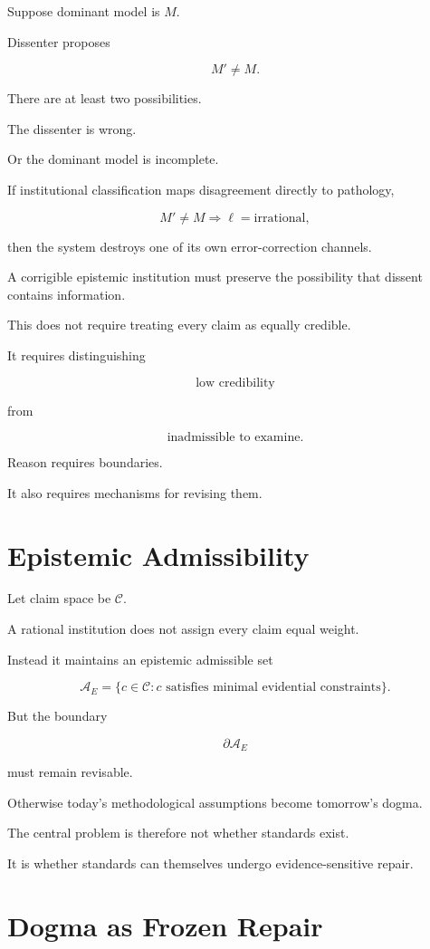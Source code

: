 \documentclass[11pt,oneside]{book}
\theoremstyle{definition}
\theoremstyle{remark}
\newcommand{\A}{\mathcal{A}}
\begin{document}
Suppose dominant model is \(M\).

Dissenter proposes

\[
M'\neq M.
\]

There are at least two possibilities.

The dissenter is wrong.

Or the dominant model is incomplete.

If institutional classification maps disagreement directly to pathology,

\[
M'\neq M
\Rightarrow
\ell=\text{irrational},
\]

then the system destroys one of its own error-correction channels.

A corrigible epistemic institution must preserve the possibility that dissent contains information.

This does not require treating every claim as equally credible.

It requires distinguishing

\[
\text{low credibility}
\]

from

\[
\text{inadmissible to examine}.
\]

Reason requires boundaries.

It also requires mechanisms for revising them.

\section{Epistemic Admissibility}

Let claim space be \(\mathcal C\).

A rational institution does not assign every claim equal weight.

Instead it maintains an epistemic admissible set

\[
\A_E
=
\{
c\in\mathcal C:
c\text{ satisfies minimal evidential constraints}
\}.
\]

But the boundary

\[
\partial\A_E
\]

must remain revisable.

Otherwise today's methodological assumptions become tomorrow's dogma.

The central problem is therefore not whether standards exist.

It is whether standards can themselves undergo evidence-sensitive repair.

\section{Dogma as Frozen Repair}
\end{document}
